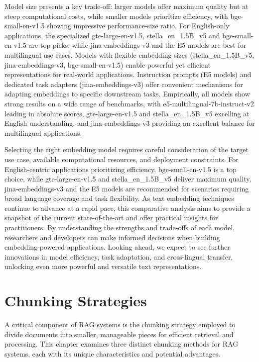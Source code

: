 Model size presents a key trade-off: larger models offer maximum quality but at steep computational costs, while smaller models prioritize efficiency, with bge-small-en-v1.5 showing impressive performance-size ratio.
For English-only applications, the specialized gte-large-en-v1.5, stella\_en\_1.5B\_v5 and bge-small-en-v1.5 are top picks, while jina-embeddings-v3 and the E5 models are best for multilingual use cases.
Models with flexible embedding sizes (stella\_en\_1.5B\_v5, jina-embeddings-v3, bge-small-en-v1.5) enable powerful yet efficient representations for real-world applications.
Instruction prompts (E5 models) and dedicated task adapters (jina-embeddings-v3) offer convenient mechanisms for adapting embeddings to specific downstream tasks.
Empirically, all models show strong results on a wide range of benchmarks, with e5-multilingual-7b-instruct-v2 leading in absolute scores, gte-large-en-v1.5 and stella\_en\_1.5B\_v5 excelling at English understanding, and jina-embeddings-v3 providing an excellent balance for multilingual applications.

Selecting the right embedding model requires careful consideration of the target use case, available computational resources, and deployment constraints.
For English-centric applications prioritizing efficiency, bge-small-en-v1.5 is a top choice, while gte-large-en-v1.5 and stella\_en\_1.5B\_v5 deliver maximum quality.
jina-embeddings-v3 and the E5 models are recommended for scenarios requiring broad language coverage and task flexibility.
As text embedding techniques continue to advance at a rapid pace, this comparative analysis aims to provide a snapshot of the current state-of-the-art and offer practical insights for practitioners.
By understanding the strengths and trade-offs of each model, researchers and developers can make informed decisions when building embedding-powered applications.
Looking ahead, we expect to see further innovations in model efficiency, task adaptation, and cross-lingual transfer, unlocking even more powerful and versatile text representations.


\section{Chunking Strategies}\label{sec:chunking-strategies}
A critical component of \ac{RAG} systems is the chunking strategy employed to divide documents into smaller, manageable pieces for efficient retrieval and processing.
This chapter examines three distinct chunking methods for \ac{RAG} systems, each with its unique characteristics and potential advantages.

